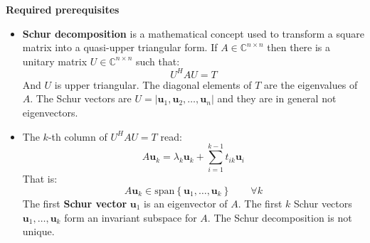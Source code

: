 \highspace
\begin{flushleft}
    \textcolor{Red2}{ \textbf{Required prerequisites}}
\end{flushleft}
\begin{itemize}
    \item \textbf{Schur decomposition} is a mathematical concept used to transform a square matrix into a quasi-upper triangular form. If $A \in \mathbb{C}^{n \times n}$ then there is a unitary matrix $U \in \mathbb{C}^{n \times n}$ such that:
    \begin{equation*}
        U^{H} A U = T
    \end{equation*}
    And $U$ is upper triangular. The diagonal elements of $T$ are the eigenvalues of $A$. The Schur vectors are $U = \left|\mathbf{u}_{1}, \mathbf{u}_{2}, \dots, \mathbf{u}_{n}\right|$ and they are in general not eigenvectors.

    \item The $k$-th column of $U^{H} A U = T$ read:
    \begin{equation*}
        A\mathbf{u}_{k} = \lambda_{k}\mathbf{u}_{k} + \displaystyle\sum_{i=1}^{k-1} t_{ik}\mathbf{u}_{i}
    \end{equation*}
    That is:
    \begin{equation*}
        A\mathbf{u}_{k} \in \mathrm{span}\left\{\mathbf{u}_{1}, \dots, \mathbf{u}_{k}\right\} \hspace{2em} \forall k
    \end{equation*}
    The first \textbf{Schur vector} $\mathbf{u}_{1}$ is an eigenvector of $A$. The first $k$ Schur vectors $\mathbf{u}_{1}, \dots, \mathbf{u}_{k}$ form an invariant subspace for $A$. The Schur decomposition is not unique.
\end{itemize}

\newpage

